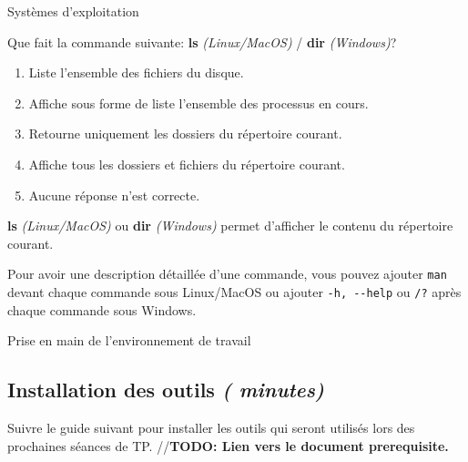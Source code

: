 \begin{section}{Systèmes d'exploitation}
    \begin{Exercice}[5 minutes]
        Que fait la commande suivante: \textbf{ls} \textit{(Linux/MacOS)} / \textbf{dir} \textit{(Windows)}?
        \begin{enumerate}
            \item Liste l'ensemble des fichiers du disque.
            \item Affiche sous forme de liste l'ensemble des processus en cours.
            \item Retourne uniquement les dossiers du répertoire courant.
            \item Affiche tous les dossiers et fichiers du répertoire courant.
            \item Aucune réponse n'est correcte.
        \end{enumerate}
        \begin{solution}
            \textbf{ls} \textit{(Linux/MacOS)} ou \textbf{dir} \textit{(Windows)} permet d'afficher le contenu du répertoire courant.
        \end{solution}
        \begin{conseil}
            Pour avoir une description détaillée d'une commande, vous pouvez ajouter \lstinline{man} devant chaque commande sous Linux/MacOS ou ajouter \lstinline{-h, --help} ou \lstinline{/?} après chaque commande sous Windows.
        \end{conseil}
    \end{Exercice}
\end{section}

\begin{section}{Prise en main de l'environnement de travail}
    \subsection{Installation des outils \textit{(\faClock {} minutes)}} 
        Suivre le guide suivant pour installer les outils qui seront utilisés lors des prochaines séances de TP. //\textbf{TODO: Lien vers le document prerequisite.}
\end{section}

